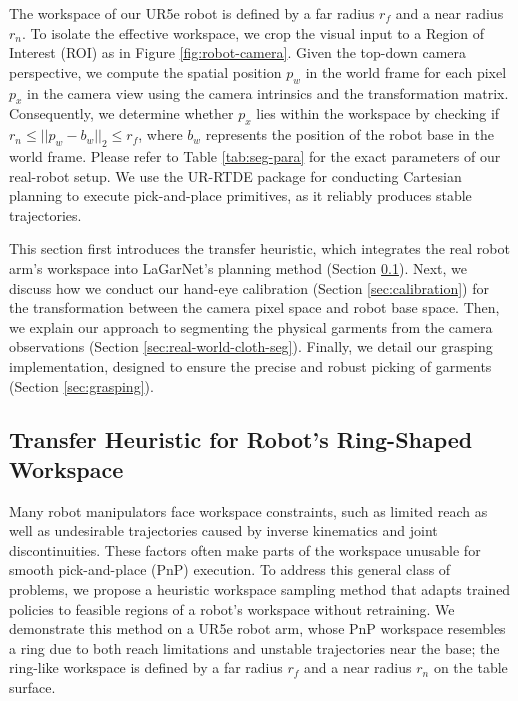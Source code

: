\documentclass[journal]{IEEEtran}
\newif\ifshowrev\showrevtrue
\newcommand{\rev}[1]{\ifshowrev\textcolor{revblue}{#1}\else#1\fi}
\begin{document}
The workspace of our UR5e robot is defined by a far radius $r_{f}$ and a near radius $r_{n}$. To isolate the effective workspace, we crop the visual input to a Region of Interest (ROI) as in Figure \ref{fig:robot-camera}. Given the top-down camera perspective, we compute the spatial position $p_w$ in the world frame for each pixel $p_x$ in the camera view using the camera intrinsics and the transformation matrix. Consequently, we determine whether $p_x$ lies within the workspace by checking if $r_n \leq ||p_w - b_w||_2 \leq r_f$, where $b_w$ represents the position of the robot base in the world frame. Please refer to Table \ref{tab:seg-para} for the exact parameters of our real-robot setup. \rev{We use the UR-RTDE package \cite{urrtde2025} for conducting Cartesian planning to execute pick-and-place primitives, as it reliably produces stable trajectories.}

This section first introduces the transfer heuristic, which integrates the real robot arm's workspace into LaGarNet's planning method (Section \ref{sec:transfer-hueristic}). Next, we discuss how we conduct our hand-eye calibration (Section \ref{sec:calibration}) for the transformation between the camera pixel space and robot base space. Then, we explain our approach to segmenting the physical garments from the camera observations (Section \ref{sec:real-world-cloth-seg}). Finally, we detail our grasping implementation, designed to ensure the precise and robust picking of garments (Section \ref{sec:grasping}).

\subsection{Transfer Heuristic for Robot's Ring-Shaped Workspace} \label{sec:transfer-hueristic}
Many robot manipulators face workspace constraints, such as limited reach as well as undesirable trajectories caused by inverse kinematics and joint discontinuities. These factors often make parts of the workspace unusable for smooth pick-and-place (PnP) execution. To address this general class of problems, we propose a heuristic workspace sampling method that adapts trained policies to feasible regions of a robot's workspace without retraining. We demonstrate this method on a UR5e robot arm, whose PnP workspace resembles a ring due to both reach limitations and unstable trajectories near the base; the ring-like workspace is defined by a far radius $r_f$ and a near radius $r_n$ on the table surface.

\end{document}
